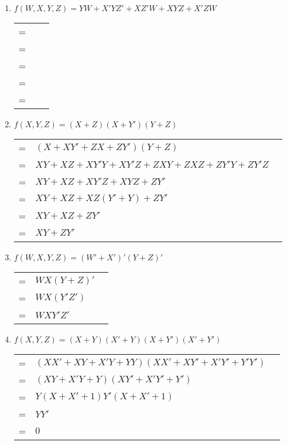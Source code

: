 \documentclass[12pt]{article}
\begin{document}
\begin{enumerate}
    \pagebreak
    
    \item $f(W, X, Y, Z) = YW + X'YZ' + XZ'W + XYZ + X'ZW$ \\
    \begin{tabular}{r l l}
        = & $ $ & \\
        = & $ $ & \\
        = & $ $ & \\
        = & $ $ & \\
        = & $ $ & \\
    \end{tabular}
    
    \pagebreak
    
    \item $f(X, Y, Z) = (X + Z)(X + Y')(Y + Z)$ \\
    \begin{tabular}{r l l}
        = & $(X + XY' + ZX + ZY')(Y + Z)$ & \\
        = & $XY + XZ + XY'Y + XY'Z + ZXY + ZXZ + ZY'Y + ZY'Z$ & \\
        = & $XY + XZ + XY'Z + XYZ + ZY'$ & \\
        = & $XY + XZ + XZ(Y' + Y) + ZY'$ & \\
        = & $XY + XZ + ZY'$ & \\
        = & $XY + ZY'$ & \\
    \end{tabular}
    
    \vspace{20mm}
    
    \item $f(W, X, Y, Z) = (W' + X')' (Y + Z)'$\\
    \begin{tabular}{r l l}
        = & $WX(Y+Z)'$ & \\
        = & $WX(Y'Z')$ & \\
        = & $WXY'Z'$ & \\
    \end{tabular}
    
    \pagebreak
    
    \item $f(X, Y, Z) = (X + Y)(X' + Y)(X + Y')(X' + Y')$ \\
    \begin{tabular}{r l l}
        = & $(XX' + XY + X'Y + YY)(XX' + XY' + X'Y' + Y'Y')$ & \\
        = & $(XY + X'Y + Y)(XY' + X'Y' + Y')$ & \\
        = & $Y(X + X' + 1)Y'(X + X' + 1)$ & \\
        = & $YY'$ & \\
        = & $0$ & \\
    \end{tabular}
    

\end{enumerate}
\end{document}

